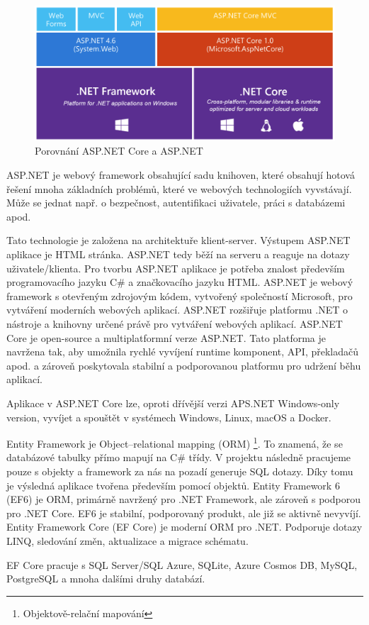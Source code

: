 \documentclass[a4paper, 12pt]{report}
\begin{document}
			\begin{figure}[h!]
				\includegraphics[width=\textwidth]{aspnetcore_aspnet}
				\caption{Porovnání ASP.NET Core a ASP.NET \cite{ASPNETCORE_ASPNET}}
				\label{ASP.NET Core a ASP.NET}
			\end{figure}
			ASP.NET je webový framework obsahující sadu knihoven, které obsahují hotová řešení mnoha základních problémů, které ve webových technologiích vyvstávají. Může se jednat např. o bezpečnost, autentifikaci uživatele, práci s databázemi apod.\par
			Tato technologie je založena na architektuře klient-server. Výstupem ASP.NET aplikace je HTML stránka. ASP.NET tedy běží na serveru a reaguje na dotazy uživatele/klienta. Pro tvorbu ASP.NET aplikace je potřeba znalost především programovacího jazyku C\# a značkovacího jazyku HTML.\cite{ASP.NET_Lekce1}
				ASP.NET je webový framework s otevřeným zdrojovým kódem, vytvořený společností Microsoft, pro vytváření moderních webových aplikací. ASP.NET rozšiřuje platformu .NET o nástroje a knihovny určené právě pro vytváření webových aplikací.\cite{ASP.NET}
				ASP.NET Core je open-source a multiplatformní verze ASP.NET. Tato platforma je navržena tak, aby umožnila rychlé vyvíjení runtime komponent, API, překladačů apod. a zároveň poskytovala stabilní a podporovanou platformu pro udržení běhu aplikací.\par
				Aplikace v ASP.NET Core lze, oproti dřívější verzi APS.NET Windows-only version, vyvíjet a spouštět v systémech Windows, Linux, macOS a Docker.\cite{ASP.NET_Core}

			Entity Framework je Object–relational mapping (ORM) \footnote{Objektově-relační mapování}. To znamená, že se databázové tabulky přímo mapují na C\# třídy. V projektu následně pracujeme pouze s objekty a framework za nás na pozadí generuje SQL dotazy. Díky tomu je výsledná aplikace tvořena především pomocí objektů.\cite{ASP.NET_Lekce8}
				Entity Framework 6 (EF6) je ORM, primárně navržený pro .NET Framework, ale zároveň s podporou pro .NET Core. EF6 je stabilní, podporovaný produkt, ale již se aktivně nevyvíjí.\cite{EF6_EFCore}
				Entity Framework Core (EF Core) je moderní ORM pro .NET. Podporuje dotazy LINQ, sledování změn, aktualizace a migrace schématu.\par
				EF Core pracuje s SQL Server/SQL Azure, SQLite, Azure Cosmos DB, MySQL, PostgreSQL a mnoha dalšími druhy databází.\cite{EF6_EFCore}
\end{document}
